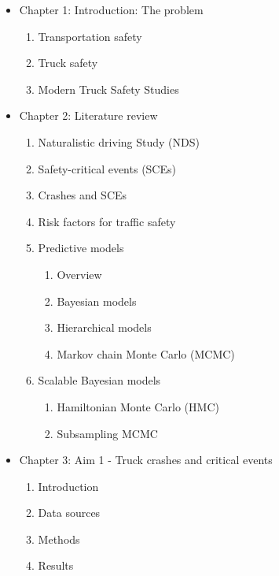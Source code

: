 \documentclass[12pt]{book}
\numberwithin{equation}{chapter}
\providecommand{\tightlist}{%
  \setlength{\itemsep}{0pt}\setlength{\parskip}{0pt}}
\begin{document}
\begin{itemize}
\tightlist
\item
  Chapter 1: Introduction: The problem

  \begin{enumerate}
  \def\labelenumi{\arabic{enumi}.}
  \tightlist
  \item
    Transportation safety
  \item
    Truck safety
  \item
    Modern Truck Safety Studies
  \end{enumerate}
\item
  Chapter 2: Literature review

  \begin{enumerate}
  \def\labelenumi{\arabic{enumi}.}
  \tightlist
  \item
    Naturalistic driving Study (NDS)
  \item
    Safety-critical events (SCEs)
  \item
    Crashes and SCEs
  \item
    Risk factors for traffic safety
  \item
    Predictive models

    \begin{enumerate}
    \def\labelenumii{\alph{enumii}.}
    \tightlist
    \item
      Overview
    \item
      Bayesian models
    \item
      Hierarchical models
    \item
      Markov chain Monte Carlo (MCMC)
    \end{enumerate}
  \item
    Scalable Bayesian models

    \begin{enumerate}
    \def\labelenumii{\alph{enumii}.}
    \tightlist
    \item
      Hamiltonian Monte Carlo (HMC)
    \item
      Subsampling MCMC
    \end{enumerate}
  \end{enumerate}
\item
  Chapter 3: Aim 1 - Truck crashes and critical events

  \begin{enumerate}
  \def\labelenumi{\arabic{enumi}.}
  \tightlist
  \item
    Introduction
  \item
    Data sources
  \item
    Methods
  \item
    Results


\end{enumerate}
\end{itemize}
\end{document}
